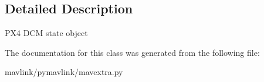 \subsection{Detailed Description}
\begin{DoxyVerb}PX4 DCM state object\end{DoxyVerb}
 

The documentation for this class was generated from the following file\+:\begin{DoxyCompactItemize}
\item 
mavlink/pymavlink/mavextra.\+py\end{DoxyCompactItemize}

